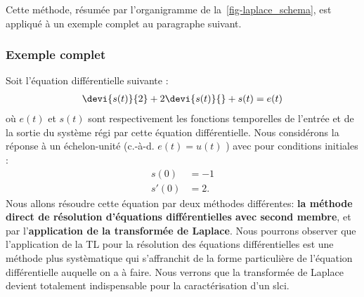 Cette méthode, résumée par l'organigramme de la~\cref{fig-laplace_schema}, 
est appliqué à un exemple complet au paragraphe suivant.
\subsubsection{Exemple complet}
Soit l'équation différentielle suivante :
\begin{align}
\devi{s(t)}{2}+2\devi{s(t)}{} + s(t) = e(t)\label{eq-diff1}
\end{align}
où $e(t)$ et $s(t)$ sont respectivement les fonctions temporelles de l'entrée 
et de la sortie du système régi par cette équation différentielle. 
Nous considérons la réponse à un échelon-unité (c.-à-d. $e(t)=u(t)$ ) 
avec pour conditions initiales :
\begin{align*}
    s(0) &=-1\\
    s'(0)&=2.
\end{align*}
Nous allons résoudre cette équation par deux méthodes différentes: 
\textbf{la méthode direct de résolution d'équations différentielles avec 
second membre}, et par l'\textbf{application de la transformée de Laplace}.
Nous pourrons observer que l'application de la TL pour la résolution
des équations différentielles est une méthode plus systèmatique qui 
s'affranchit de la forme particulière de l'équation différentielle 
auquelle on a à faire. Nous verrons que la transformée de Laplace devient 
totalement indispensable pour la caractérisation d'un \gls{slci}.
\newpage

\captionsetup{width=0.9\linewidth,labelfont=bf}
